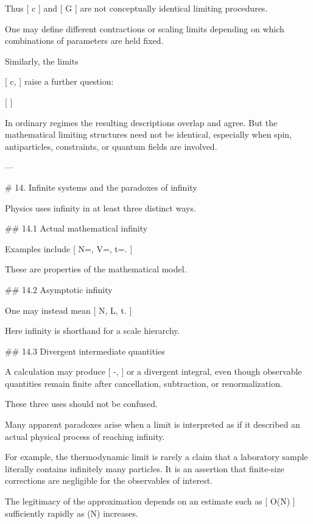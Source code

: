 Thus
[
c\rightarrow\infty
]
and
[
G
]
are not conceptually identical limiting procedures.

One may define different contractions or scaling limits depending on which combinations of parameters are held fixed.

Similarly, the limits

[
c\rightarrow\infty,
\qquad
\hbar{}
]
raise a further question:

[
]

In ordinary regimes the resulting descriptions overlap and agree. But the mathematical limiting structures need not be identical, especially when spin, antiparticles, constraints, or quantum fields are involved.

---

# 14. Infinite systems and the paradoxes of infinity

Physics uses infinity in at least three distinct ways.

## 14.1 Actual mathematical infinity

Examples include
[
N=\infty,
\qquad
V=\infty,
\qquad
t=\infty.
]

These are properties of the mathematical model.

## 14.2 Asymptotic infinity

One may instead mean
[
N,
\qquad
L\gg\ell,
\qquad
t\gg\tau.
]

Here infinity is shorthand for a scale hierarchy.

## 14.3 Divergent intermediate quantities

A calculation may produce
[
\infty-\infty,
]
or a divergent integral, even though observable quantities remain finite after cancellation, subtraction, or renormalization.

These three uses should not be confused.

Many apparent paradoxes arise when a limit is interpreted as if it described an actual physical process of reaching infinity.

For example, the thermodynamic limit is rarely a claim that a laboratory sample literally contains infinitely many particles. It is an assertion that finite-size corrections are negligible for the observables of interest.

The legitimacy of the approximation depends on an estimate such as
[
\Delta O(N)
]
sufficiently rapidly as (N) increases.

